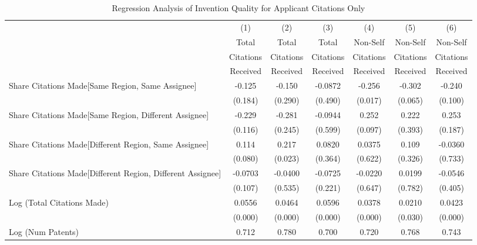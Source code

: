 \documentclass[12pt,letterpaper]{article}
\begin{document}
\begin{table}[htbp]\centering \caption{Regression Analysis of Invention Quality for Applicant Citations Only \label{a.model123192021}}
\scriptsize
\singlespacing
\begin{tabular}{l*{6}{c}} \hline
                &\multicolumn{1}{c}{(1)}&\multicolumn{1}{c}{(2)}&\multicolumn{1}{c}{(3)}&\multicolumn{1}{c}{(4)}&\multicolumn{1}{c}{(5)}&\multicolumn{1}{c}{(6)}\\
                &\multicolumn{1}{c}{Total}&\multicolumn{1}{c}{Total}&\multicolumn{1}{c}{Total}&\multicolumn{1}{c}{Non-Self}&\multicolumn{1}{c}{Non-Self}&\multicolumn{1}{c}{Non-Self}\\
                &\multicolumn{1}{c}{Citations}&\multicolumn{1}{c}{Citations}&\multicolumn{1}{c}{Citations}&\multicolumn{1}{c}{Citations}&\multicolumn{1}{c}{Citations}&\multicolumn{1}{c}{Citations}\\
                 &\multicolumn{1}{c}{Received}&\multicolumn{1}{c}{Received}&\multicolumn{1}{c}{Received}&\multicolumn{1}{c}{Received}&\multicolumn{1}{c}{Received}&\multicolumn{1}{c}{Received}\\
\hline
Share Citations Made[Same Region, Same Assignee]&   -0.125&   -0.150&  -0.0872&   -0.256&   -0.302&   -0.240\\
                &  (0.184)&  (0.290)&  (0.490)&  (0.017)&  (0.065)&  (0.100)\\
Share Citations Made[Same Region, Different Assignee]&   -0.229&   -0.281&  -0.0944&    0.252&    0.222&    0.253\\
                &  (0.116)&  (0.245)&  (0.599)&  (0.097)&  (0.393)&  (0.187)\\
Share Citations Made[Different Region, Same Assignee]&    0.114&    0.217&   0.0820&   0.0375&    0.109&  -0.0360\\
                &  (0.080)&  (0.023)&  (0.364)&  (0.622)&  (0.326)&  (0.733)\\
Share Citations Made[Different Region, Different Assignee]&  -0.0703&  -0.0400&  -0.0725&  -0.0220&   0.0199&  -0.0546\\
                &  (0.107)&  (0.535)&  (0.221)&  (0.647)&  (0.782)&  (0.405)\\
Log (Total Citations Made)&   0.0556&   0.0464&   0.0596&   0.0378&   0.0210&   0.0423\\
                &  (0.000)&  (0.000)&  (0.000)&  (0.000)&  (0.030)&  (0.000)\\
Log (Num Patents)&    0.712&    0.780&    0.700&    0.720&    0.768&    0.743\\

\end{tabular}
\end{table}
\end{document}
